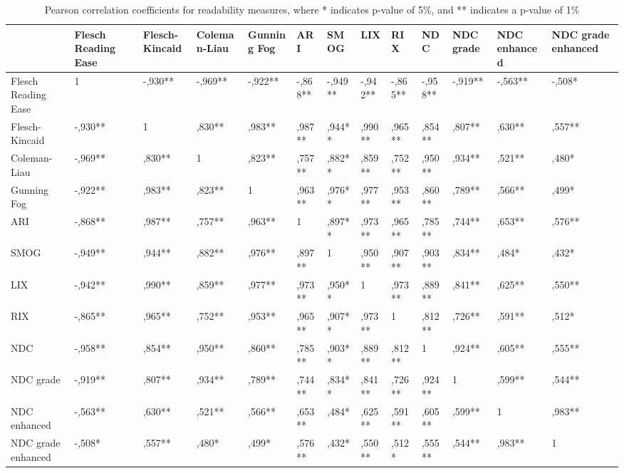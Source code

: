 \documentclass[runningheads,a4paper]{llncs}
\begin{document}
\begin{table}
  \centering
  \caption{Pearson correlation coefficients for readability measures, where * indicates p-value of 5\%, and ** indicates a p-value of 1\%}
    \begin{tabular}{p{3cm}p{1.1cm}p{1.2cm}p{1.5cm}p{1.4cm}p{1.1cm}p{1.1cm}p{1.1cm}p{1.1cm}p{1.1cm}p{1.1cm}p{1.1cm}p{1.1cm}}
    \toprule
          & \textbf{Flesch Reading Ease} & \textbf{Flesch-Kincaid} & \textbf{Coleman-Liau} & \textbf{Gunning Fog} & \textbf{ARI} & \textbf{SMOG} & \textbf{LIX} & \textbf{RIX} & \textbf{NDC} & \textbf{NDC grade} & \textbf{NDC enhanced} & \textbf{NDC grade enhanced} \\
    \midrule
    Flesch Reading Ease & 1     & -,930** & -,969** & -,922** & -,868** & -,949** & -,942** & -,865** & -,958** & -,919** & -,563** & -,508* \\
    Flesch-Kincaid & -,930** & 1     & ,830** & ,983** & ,987** & ,944** & ,990** & ,965** & ,854** & ,807** & ,630** & ,557** \\
    Coleman-Liau & -,969** & ,830** & 1     & ,823** & ,757** & ,882** & ,859** & ,752** & ,950** & ,934** & ,521** & ,480* \\
    Gunning Fog & -,922** & ,983** & ,823** & 1     & ,963** & ,976** & ,977** & ,953** & ,860** & ,789** & ,566** & ,499* \\
    ARI   & -,868** & ,987** & ,757** & ,963** & 1     & ,897** & ,973** & ,965** & ,785** & ,744** & ,653** & ,576** \\
    SMOG  & -,949** & ,944** & ,882** & ,976** & ,897** & 1     & ,950** & ,907** & ,903** & ,834** & ,484* & ,432* \\
    LIX   & -,942** & ,990** & ,859** & ,977** & ,973** & ,950** & 1     & ,973** & ,889** & ,841** & ,625** & ,550** \\
    RIX   & -,865** & ,965** & ,752** & ,953** & ,965** & ,907** & ,973** & 1     & ,812** & ,726** & ,591** & ,512* \\
    NDC   & -,958** & ,854** & ,950** & ,860** & ,785** & ,903** & ,889** & ,812** & 1     & ,924** & ,605** & ,555** \\
    NDC grade & -,919** & ,807** & ,934** & ,789** & ,744** & ,834** & ,841** & ,726** & ,924** & 1     & ,599** & ,544** \\
    NDC enhanced & -,563** & ,630** & ,521** & ,566** & ,653** & ,484* & ,625** & ,591** & ,605** & ,599** & 1     & ,983** \\
    NDC grade enhanced & -,508* & ,557** & ,480* & ,499* & ,576** & ,432* & ,550** & ,512* & ,555** & ,544** & ,983** & 1 \\
    \bottomrule
    \end{tabular}%
  \label{tab:correlation}%
\end{table}%
\end{document}
